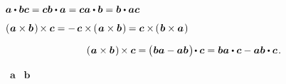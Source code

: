 \noindent ${
\bm{a} \dotp \bm{b} \bm{c} = \bm{c} \bm{b} \dotp \bm{a} = \bm{c} \bm{a} \dotp \bm{b} = \bm{b} \dotp \bm{a} \bm{c}
}$

\noindent ${
\left(\hspace{.1ex} \bm{a} \times \bm{b} \hspace{.2ex}\right) \hspace{-0.2ex} \times \bm{c}
= - \hspace{.33ex} \bm{c} \times \hspace{-0.15ex} \left(\hspace{.2ex}{\bm{a} \times \bm{b}}\hspace{.15ex}\right) \hspace{-0.1ex}
= \bm{c} \times \hspace{-0.2ex} \left(\hspace{.2ex}{\bm{b} \times \bm{a}}\hspace{.15ex}\right)
}$

\vspace{-0.15em}\noindent
\textcolor{magenta}{ }

\nopagebreak\vspace{-0.2em}\begin{equation}
\left(\hspace{.1ex} \bm{a} \times \bm{b} \hspace{.2ex}\right) \hspace{-0.2ex} \times \bm{c}
= \hspace{-0.15ex} \bigl( \hspace{.1ex} \bm{b} \bm{a} - \bm{a} \bm{b} \hspace{.15ex} \bigr) \hspace{-0.3ex} \dotp \bm{c}
= \bm{b} \bm{a} \dotp \bm{c} - \bm{a} \bm{b} \dotp \bm{c}
\hspace{.2ex} .
\end{equation}

\vspace{-0.15em}\noindent
{}
~$\bm{a}$
~$\bm{b}$

